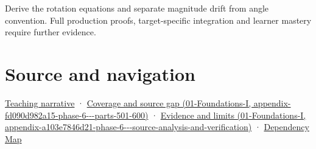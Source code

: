Derive the rotation equations and separate magnitude drift from angle convention. Full production proofs, target-specific integration and learner mastery require further evidence.

\section{Source and navigation}\label{appendix-f77eadcc4a93-source-and-navigation}

\href{Continuous\%20Notes/Computing\%20Foundations\%20-\%20From\%20Bits\%20to\%20C++\%20and\%20Systems\%20APIs\#Rotation\%20first\%20becomes\%20understandable\%20in\%20a\%20plane}{Teaching narrative} · \href{../01-Foundations-I/main.pdf\#nameddest=appendix-fd090d982a15-phase-6---parts-501-600}{Coverage and source gap (01-Foundations-I, appendix-fd090d982a15-phase-6-\/-\/-parts-501-600)} · \href{../01-Foundations-I/main.pdf\#nameddest=appendix-a103e7846d21-phase-6---source-analysis-and-verification}{Evidence and limits (01-Foundations-I, appendix-a103e7846d21-phase-6-\/-\/-source-analysis-and-verification)} · \hyperref[appendix-4ad47bdd269a]{Dependency Map}
